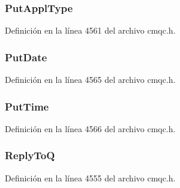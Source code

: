 \hypertarget{structtag_m_q_m_d1_a6d9e0e0fe9075017c939213948c747dc}{}
\subsubsection[{Put\+Appl\+Type}]{ Put\+Appl\+Type}\label{structtag_m_q_m_d1_a6d9e0e0fe9075017c939213948c747dc}


Definición en la línea 4561 del archivo cmqc.\+h.

\hypertarget{structtag_m_q_m_d1_add3e7fe139edfa323295d6c7bc764cc5}{}
\subsubsection[{Put\+Date}]{ Put\+Date}\label{structtag_m_q_m_d1_add3e7fe139edfa323295d6c7bc764cc5}


Definición en la línea 4565 del archivo cmqc.\+h.

\hypertarget{structtag_m_q_m_d1_aec51e7b9face9480a893ae5d47781ee7}{}
\subsubsection[{Put\+Time}]{ Put\+Time}\label{structtag_m_q_m_d1_aec51e7b9face9480a893ae5d47781ee7}


Definición en la línea 4566 del archivo cmqc.\+h.

\hypertarget{structtag_m_q_m_d1_a7073875015f870e1d1a02e988ce698b3}{}
\subsubsection[{Reply\+To\+Q}]{ Reply\+To\+Q}\label{structtag_m_q_m_d1_a7073875015f870e1d1a02e988ce698b3}


Definición en la línea 4555 del archivo cmqc.\+h.

